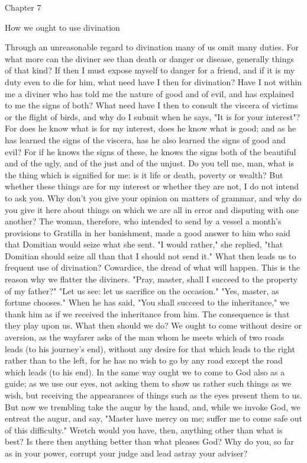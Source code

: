 \documentclass[a4paper]{article}
\begin{document}
Chapter 7

How we ought to use divination

    Through an unreasonable regard to divination many of us omit many duties.
For what more can the diviner see than death or danger or disease, generally
things of that kind? If then I must expose myself to danger for a friend, and
if it is my duty even to die for him, what need have I then for divination?
Have I not within me a diviner who has told me the nature of good and of evil,
and has explained to me the signs of both? What need have I then to consult the
viscera of victims or the flight of birds, and why do I submit when he says,
"It is for your interest"? For does he know what is for my interest, does he
know what is good; and as he has learned the signs of the viscera, has he also
learned the signs of good and evil? For if he knows the signs of these, he
knows the signs both of the beautiful and of the ugly, and of the just and of
the unjust. Do you tell me, man, what is the thing which is signified for me:
is it life or death, poverty or wealth? But whether these things are for my
interest or whether they are not, I do not intend to ask you. Why don't you
give your opinion on matters of grammar, and why do you give it here about
things on which we are all in error and disputing with one another? The woman,
therefore, who intended to send by a vessel a month's provisions to Gratilla in
her banishment, made a good answer to him who said that Domitian would seize
what she sent. "I would rather," she replied, "that Domitian should seize all
than that I should not send it."
    What then leads us to frequent use of divination? Cowardice, the dread of
what will happen. This is the reason why we flatter the diviners. "Pray,
master, shall I succeed to the property of my father?" "Let us see: let us
sacrifice on the occasion." "Yes, master, as fortune chooses." When he has
said, "You shall succeed to the inheritance," we thank him as if we received
the inheritance from him. The consequence is that they play upon us.
    What then should we do? We ought to come without desire or aversion, as the
wayfarer asks of the man whom he meets which of two roads leads (to his
journey's end), without any desire for that which leads to the right rather
than to the left, for he has no wish to go by any road except the road which
leads (to his end). In the same way ought we to come to God also as a guide; as
we use our eyes, not asking them to show us rather such things as we wish, but
receiving the appearances of things such as the eyes present them to us. But
now we trembling take the augur by the hand, and, while we invoke God, we
entreat the augur, and say, "Master have mercy on me; suffer me to come safe
out of this difficulty." Wretch would you have, then, anything other than what
is best? Is there then anything better than what pleases God? Why do you, so
far as in your power, corrupt your judge and lead astray your adviser?
\end{document}
